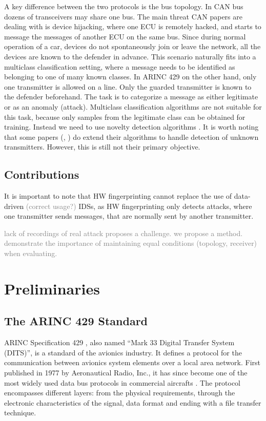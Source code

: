 \documentclass[conference]{IEEEtran}
\begin{document}
  A key difference between the two protocols is the bus topology. In CAN bus dozens of transceivers may share one bus. The main threat CAN papers are dealing with is device hijacking, where one ECU is remotely hacked, and starts to message the messages of another ECU on the same bus. Since during normal operation of a car, devices do not spontaneously join or leave the network, all the devices are known to the defender in advance. This scenario naturally fits into a multiclass classification setting, where a message needs to be identified as belonging to one of many known classes. In ARINC 429 on the other hand, only one transmitter is allowed on a line. Only the guarded transmitter is known to the defender beforehand. The task is to categorize a message as either legitimate or as an anomaly (attack). Multiclass classification algorithms are not suitable for this task, because only samples from the legitimate class can be obtained for training. Instead we need to use novelty detection algorithms \cite{pimentel2014review}. It is worth noting that some papers (\cite{choi2018identifying}, \cite{choi2018voltageids}) do extend their algorithms to handle detection of unknown transmitters. However, this is still not their primary objective.
  
\subsection{Contributions}
  It is important to note that HW fingerprinting cannot replace the use of data-driven \textcolor{gray}{(correct usage?)} IDSs, as HW fingerprinting only detects attacks, where one transmitter sends messages, that are normally sent by another transmitter.
  
  \textcolor{gray}{lack of recordings of real attack proposes a challenge. we propose a method. demonstrate the importance of maintaining equal conditions (topology, receiver) when evaluating.}

\section{Preliminaries}
\subsection{The ARINC 429 Standard}
  ARINC Specification 429 \cite{}, also named ``Mark 33 Digital Transfer System (DITS)'', is a standard of the avionics industry. It defines a protocol for the communication between avionics system elements over a local area network. First published in 1977 by Aeronautical Radio, Inc., it has since become one of the most widely used data bus protocols in commercial aircrafts \cite{}. The protocol encompasses different layers: from the physical requirements, through the electronic characteristics of the signal, data format and ending with a file transfer technique.
\end{document}

